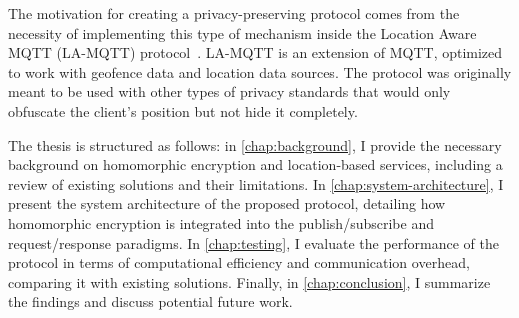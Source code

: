 
The motivation for creating a privacy-preserving protocol comes from the necessity of implementing this type of mechanism inside the Location Aware MQTT (LA-MQTT) protocol~\cite{montori2022lamqtt}. LA-MQTT is an extension of MQTT, optimized to work with geofence data and location data sources. The protocol was originally meant to be used with other types of privacy standards that would only obfuscate the client's position but not hide it completely.

The thesis is structured as follows: in \cref{chap:background}, I provide the necessary background on homomorphic encryption and location-based services, including a review of existing solutions and their limitations. In \cref{chap:system-architecture}, I present the system architecture of the proposed protocol, detailing how homomorphic encryption is integrated into the publish/subscribe and request/response paradigms. In \cref{chap:testing}, I evaluate the performance of the protocol in terms of computational efficiency and communication overhead, comparing it with existing solutions. Finally, in \cref{chap:conclusion}, I summarize the findings and discuss potential future work.
